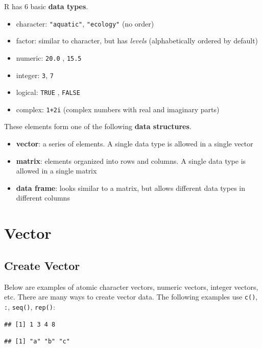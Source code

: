 \documentclass[
]{book}
\providecommand{\tightlist}{%
  \setlength{\itemsep}{0pt}\setlength{\parskip}{0pt}}
\begin{document}
R has 6 basic \textbf{data types}.

\begin{itemize}
\tightlist
\item
  character: \texttt{"aquatic"}, \texttt{"ecology"} (no order)
\item
  factor: similar to character, but has \emph{levels} (alphabetically ordered by default)
\item
  numeric: \texttt{20.0} , \texttt{15.5}
\item
  integer: \texttt{3}, \texttt{7}
\item
  logical: \texttt{TRUE} , \texttt{FALSE}
\item
  complex: \texttt{1+2i} (complex numbers with real and imaginary parts)
\end{itemize}

These elements form one of the following \textbf{data structures}.

\begin{itemize}
\tightlist
\item
  \textbf{vector}: a series of elements. A single data type is allowed in a single vector
\item
  \textbf{matrix}: elements organized into rows and columns. A single data type is allowed in a single matrix
\item
  \textbf{data frame}: looks similar to a matrix, but allows different data types in different columns
\end{itemize}

\hypertarget{vector}{%
\section{Vector}\label{vector}}

\hypertarget{create-vector}{%
\subsection{Create Vector}\label{create-vector}}

Below are examples of atomic character vectors, numeric vectors, integer vectors, etc. There are many ways to create vector data. The following examples use \texttt{c()}, \texttt{:}, \texttt{seq()}, \texttt{rep()}:

\begin{verbatim}
## [1] 1 3 4 8
\end{verbatim}

\begin{verbatim}
## [1] "a" "b" "c"
\end{verbatim}
\end{document}
